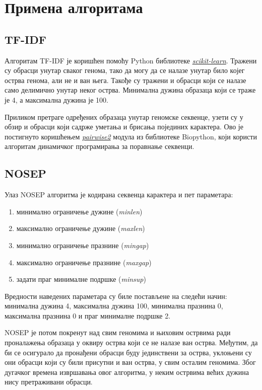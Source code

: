 \documentclass[12pt]{article}
\begin{document}
\section{Примена алгоритама}

\subsection{TF-IDF}
Алгоритам TF-IDF је коришћен помоћу Python библиотеке \textit{\href{https://scikit-learn.org/}{scikit-learn}}. Тражени су обрасци унутар сваког генома, тако да могу да се налазе унутар било којег острва генома, али не и ван њега. Такође су тражени и обрасци који се налазе само делимично унутар неког острва. Минимална дужина образаца који се траже је 4, а максимална дужина је 100.

Приликом претраге одређених образаца унутар геномске секвенце, узети су у обзир и обрасци који садрже уметања и брисања појединих карактера. Ово је постигнуто коришћењем \textit{\href{https://biopython.org/docs/1.75/api/Bio.pairwise2.html}{pairwise2}} модула из библиотеке Biopython, који користи алгоритам динамичког програмирања за поравнање секвенци.

\subsection{NOSEP}

Улаз NOSEP алгоритма је кодирана секвенца карактера и пет параметара:
\begin{enumerate}
 \item минимално ограничење дужине (\textit{minlen})
 \item максимално ограничење дужине (\textit{maxlen})
 \item минимално ограничење празнине (\textit{mingap})
 \item максимално ограничење празнине (\textit{maxgap})
 \item задати праг минималне подршке (\textit{minsup})\\
\end{enumerate}

Вредности наведених параметара су биле постављене на следећи начин: минимална дужина 4, максимална дужина 100, минимална празнина 0, максимална празнина 0 и праг минималне подршке 2.

NOSEP је потом покренут над свим геномима и њиховим острвима ради проналажења образаца у оквиру острва који се не налазе ван острва. Међутим, да би се осигурало да пронађени обрасци буду јединствени за острва, уклоњени су они обрасци који су били присутни и ван острва, у свим осталим геномима. Због дугачког времена извршавања овог алгоритма, у неким острвима већих дужина нису претраживани обрасци.
\end{document}
